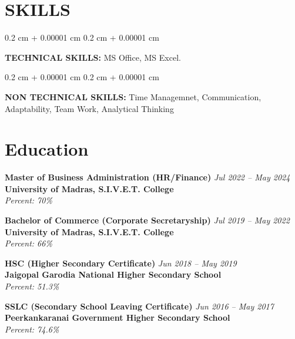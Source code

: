 \documentclass[10pt, letterpaper]{article}
\newenvironment{onecolentry}{
    \begin{adjustwidth}{
        0.2 cm + 0.00001 cm
    }{
        0.2 cm + 0.00001 cm
    }
}{
    \end{adjustwidth}
} %
\begin{document}
    
    \section{SKILLS}



        
        \begin{onecolentry}
            \textbf{TECHNICAL SKILLS:} MS Office, MS Excel.
        \end{onecolentry}

        \vspace{0.2 cm}

        \begin{onecolentry}
            \textbf{NON TECHNICAL SKILLS:} Time Managemnet, Communication, Adaptability, Team Work, Analytical Thinking
        \end{onecolentry}
        
        \vspace{0.2 cm}



    


    \section{Education}

\textbf{Master of Business Administration (HR/Finance)} \hfill \textit{Jul 2022 – May 2024} \\
\textbf{University of Madras, S.I.V.E.T. College} \\
\textit{Percent: 70\%} \\
\vspace{0.2cm}

\textbf{Bachelor of Commerce (Corporate Secretaryship)} \hfill \textit{Jul 2019 – May 2022} \\
\textbf{University of Madras, S.I.V.E.T. College} \\
\textit{Percent: 66\%} \\
\vspace{0.2cm}

\textbf{HSC (Higher Secondary Certificate)} \hfill \textit{Jun 2018 – May 2019} \\
\textbf{Jaigopal Garodia National Higher Secondary School} \\
\textit{Percent: 51.3\%} \\
\vspace{0.2cm}

\textbf{SSLC (Secondary School Leaving Certificate)} \hfill \textit{Jun 2016 – May 2017} \\
\textbf{Peerkankaranai Government Higher Secondary School} \\
\textit{Percent: 74.6\%} \\
\end{document}
